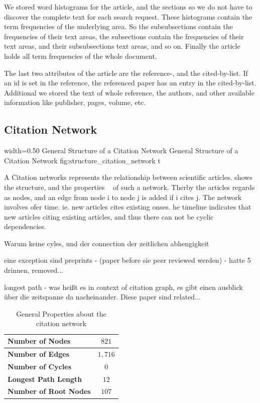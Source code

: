 We stored word histograms for the article, and the sections so we do not have to discover the complete text for each search request. These histograms contain the term frequencies of the underlying area. So the subsubsections contain the frequencies of their text areas, the subsections contain the frequencies of their text areas, and their subsubsections text areas, and so on. Finally the article holds all term frequencies of the whole document.

The last two attributes of the article are the reference-, and the cited-by-list. If an id is set in the reference, the referenced paper has an entry in the cited-by-list. Additional we stored the text of whole reference, the authors, and other available information like publisher, pages, volume, etc.

\subsection{Citation Network}
\label{sec:citation_network}

      {width=0.50\textwidth}
      {General Structure of a Citation Network}
      {General Structure of a Citation Network}
      {fig:structure_citation_network}
      {t}

A Citation networks represents the relationship between scientific articles.  shows the structure, and the properties ~\cite{kas2011} of such a network. Therby the articles regards as nodes, and an edge from node i to node j is added if i cites j. The network involves ofer time. ie. new articles cites existing onses. he timeline indicates that new articles citing existing articles, and thus there can not be cyclic dependencies.

Warum keine cyles, und der connection der zeitlichen abhengigkeit

eine exception sind preprints - (paper before sie peer reviewed werden) - hatte 5 drinnen, removed...

longest path - was heißt es in context of citation graph, es gibt einen ausblick über die zeitspanne da nacheinander. Diese paper sind related...

\begin{table}
  \centering
  \begin{tabular}{ l c }
    \toprule
    \textbf{Number of Nodes}      & $821$  \\ \midrule
    \textbf{Number of Edges}      & $1,716$ \\ \midrule
    \textbf{Number of Cycles}     & $0$    \\ \midrule
    \textbf{Longest Path Length}  & $12$   \\ \midrule
    \textbf{Number of Root Nodes} & $107$  \\
    \bottomrule
  \end{tabular}
  \caption[General Properties about the citation network]{General Properties about the citation network}
  \label{tbl:general_properties_about_the_graph}
\end{table}

